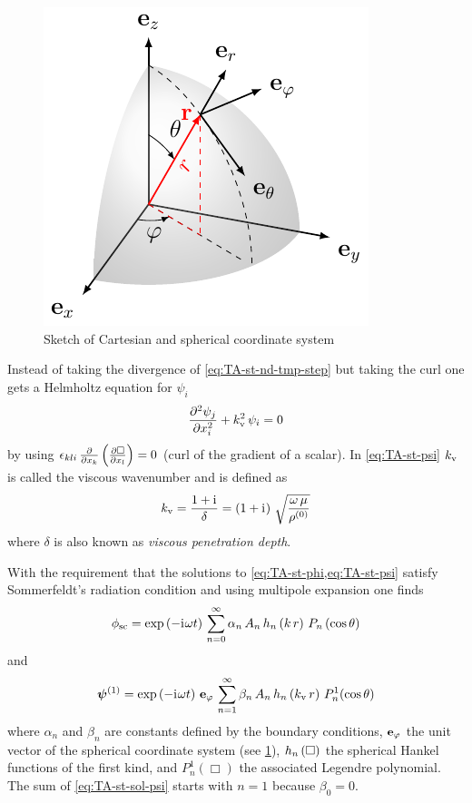 \begin{figure}[tbp]
  \centering
  \includegraphics[]{External/coordinate.pdf}
  \caption{Sketch of Cartesian and spherical coordinate system}
  \label{fig:TA-coordinate}
\end{figure}

Instead of taking the divergence of \cref{eq:TA-st-nd-tmp-step} but taking the 
curl one gets a Helmholtz equation for $\psi_{i}$
\begin{equation}
  \pdv[2]{\psi_{j}}{x_{i}} + k_{\mathrm{v}}^{2}\,\psi_{i} = 0
  \label{eq:TA-st-psi}
\end{equation}
by using $\epsilon_{kli}\,\pdv{x_{k}}\left( \pdv{\Box}{x_{l}} \right) = 0$ 
(curl of the gradient of a scalar). In \cref{eq:TA-st-psi} $k_{\mathrm{v}}$ is 
called the viscous wavenumber and is defined as
\begin{equation}
  k_{\mathrm{v}} = \frac{1 + \mathrm{i}\mkern1mu}{\delta} = \left( 1 + \mathrm{i}\mkern1mu \right)\, 
  \sqrt{\frac{\omega\,\mu}{\rho^{(0)}}}
  \label{eq:TA-st-visc-wavenumber}
\end{equation}
where $\delta$ is also known as \emph{viscous penetration depth}.

With the requirement that the solutions to \cref{eq:TA-st-phi,eq:TA-st-psi} 
satisfy Sommerfeldt's radiation condition and using multipole expansion one 
finds
\begin{equation}
  \phi_{\mathrm{sc}} = \exp\left( -\mathrm{i}\mkern1mu\omega t \right)\,
  \sum\limits^{\infty}_{n=0} 
  \alpha_{n}\,A_{n}\,h_{n}\left(k\,r\right)\,P_{n}\left(\cos\theta\right)
  \label{eq:TA-st-sol-phi}
\end{equation}
and
\begin{equation}
  \vb*{\psi}^{(1)} = \exp\left( -\mathrm{i}\mkern1mu\omega t \right)\,\vb{e}_{\varphi}\,
  \sum\limits^{\infty}_{n=1} 
  \beta_{n}\,A_{n}\,h_{n}\left(k_{\mathrm{v}}\,r\right)\,P^{1}_{n}(\cos\theta)
  \label{eq:TA-st-sol-psi}
\end{equation}
where $\alpha_{n}$ and $\beta_{n}$ are constants defined by the boundary 
conditions, $\vb{e}_{\varphi}$ the unit vector of the spherical coordinate 
system (see \cref{fig:TA-coordinate}), $h_{n}\left(\Box\right)$ the spherical Hankel 
functions of the first kind, and $P^{1}_{n}\left( \Box \right)$ the associated 
Legendre polynomial. The sum of \cref{eq:TA-st-sol-psi} starts with $n=1$ 
because $\beta_{0}=0$.

